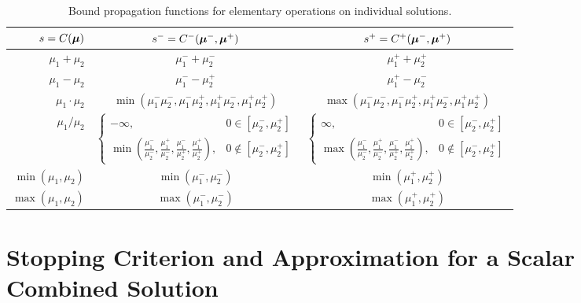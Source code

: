 \documentclass{article}[12pt]
\begin{document}
\begin{table}[H]
\begin{tabular}{r  c  c}
    $s=C(\boldsymbol{\mu})$ & $s^- = C^-(\boldsymbol{\mu}^-,\boldsymbol{\mu}^+)$ & $s^+ = C^+(\boldsymbol{\mu}^-,\boldsymbol{\mu}^+)$ \\
    \hline
    $\mu_1+\mu_2$ & $\mu_1^-+\mu_2^-$ & $\mu_1^++\mu_2^+$ \\
    $\mu_1-\mu_2$ & $\mu_1^--\mu_2^+$ & $\mu_1^+-\mu_2^-$ \\
    $\mu_1 \cdot \mu_2$ & $\min(\mu_1^-\mu_2^-,\mu_1^-\mu_2^+,\mu_1^+\mu_2^-,\mu_1^+\mu_2^+)$ & $\max(\mu_1^-\mu_2^-,\mu_1^-\mu_2^+,\mu_1^+\mu_2^-,\mu_1^+\mu_2^+)$ \\
    $\mu_1 / \mu_2$ & $\begin{cases} -\infty, & 0 \in [\mu_2^-,\mu_2^+] \\ \min\left(\frac{\mu_1^-}{\mu_2^-},\frac{\mu_1^+}{\mu_2^-},\frac{\mu_1^-}{\mu_2^+},\frac{\mu_1^+}{\mu_2^+}\right), & 0 \notin [\mu_2^-,\mu_2^+] \end{cases}$ & $\begin{cases} \infty, & 0 \in [\mu_2^-,\mu_2^+] \\ \max\left(\frac{\mu_1^-}{\mu_2^-},\frac{\mu_1^+}{\mu_2^-},\frac{\mu_1^-}{\mu_2^+},\frac{\mu_1^+}{\mu_2^+}\right), & 0 \notin [\mu_2^-,\mu_2^+] \end{cases}$ \\
    $\min(\mu_1,\mu_2)$ & $\min(\mu_1^-,\mu_2^-)$ & $\min(\mu_1^+,\mu_2^+)$ \\
    $\max(\mu_1,\mu_2)$ & $\max(\mu_1^-,\mu_2^-)$ & $\max(\mu_1^+,\mu_2^+)$ \\
    \hline
\end{tabular}
\caption{Bound propagation functions for elementary operations on individual solutions.}
\label{table:elementary_ops_Cpm}
\end{table}

\section{Stopping Criterion and Approximation for a Scalar Combined Solution} \label{sec:opt_comb_sol_sc}
\end{document}
